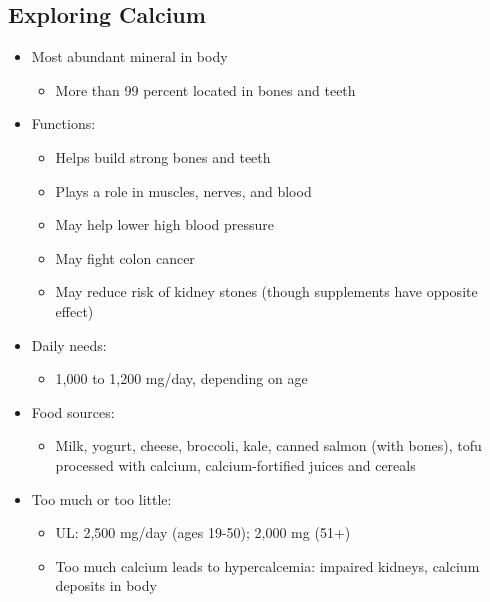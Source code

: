 \documentclass[12pt]{article}
\begin{document}
        \subsection{Exploring Calcium}
            \begin{itemize}
                \item Most abundant mineral in body
                    \begin{itemize}
                        \item More than 99 percent located in bones and teeth
                    \end{itemize}
                \item Functions:
                    \begin{itemize}
                        \item Helps build strong bones and teeth
                        \item Plays a role in muscles, nerves, and blood
                        \item May help lower high blood pressure
                        \item May fight colon cancer
                        \item May reduce risk of kidney stones (though supplements have opposite effect)
                    \end{itemize}
                \item Daily needs:
                    \begin{itemize}
                        \item 1,000 to 1,200 mg/day, depending on age
                    \end{itemize}
                \item Food sources:
                    \begin{itemize}
                        \item Milk, yogurt, cheese, broccoli, kale, canned salmon (with bones), tofu processed with calcium, calcium-fortified juices and cereals
                    \end{itemize}
                \item Too much or too little:
                    \begin{itemize}
                        \item UL: 2,500 mg/day (ages 19-50); 2,000 mg (51+)
                        \item Too much calcium leads to hypercalcemia: impaired kidneys, calcium deposits in body

\end{itemize}
\end{itemize}
\end{document}
